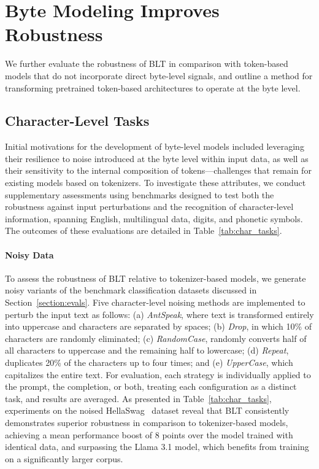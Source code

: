 \section{Byte Modeling Improves Robustness} We further evaluate the robustness of {\textsc BLT} in comparison with token-based models that do not incorporate direct byte-level signals, and outline a method for transforming pretrained token-based architectures to operate at the byte level.
\label{sec:robustness}

\subsection{Character-Level Tasks}

Initial motivations for the development of byte-level models included leveraging their resilience to noise introduced at the byte level within input data, as well as their sensitivity to the internal composition of tokens—challenges that remain for existing models based on tokenizers. To investigate these attributes, we conduct supplementary assessments using benchmarks designed to test both the robustness against input perturbations and the recognition of character-level information, spanning English, multilingual data, digits, and phonetic symbols. The outcomes of these evaluations are detailed in Table~\ref{tab:char_tasks}.

\paragraph{Noisy Data} To assess the robustness of {\textsc BLT} relative to tokenizer-based models, we generate noisy variants of the benchmark classification datasets discussed in Section~\ref{section:evals}. Five character-level noising methods are implemented to perturb the input text as follows: (a) \textit{AntSpeak}, where text is transformed entirely into uppercase and characters are separated by spaces; (b) \textit{Drop}, in which 10\% of characters are randomly eliminated; (c) \textit{RandomCase}, randomly converts half of all characters to uppercase and the remaining half to lowercase; (d) \textit{Repeat}, duplicates 20\% of the characters up to four times; and (e) \textit{UpperCase}, which capitalizes the entire text. For evaluation, each strategy is individually applied to the prompt, the completion, or both, treating each configuration as a distinct task, and results are averaged. As presented in Table~\ref{tab:char_tasks}, experiments on the noised HellaSwag~\citep{Eval_hellaswag} dataset reveal that {\textsc BLT} consistently demonstrates superior robustness in comparison to tokenizer-based models, achieving a mean performance boost of 8 points over the model trained with identical data, and surpassing the Llama 3.1 model, which benefits from training on a significantly larger corpus.

